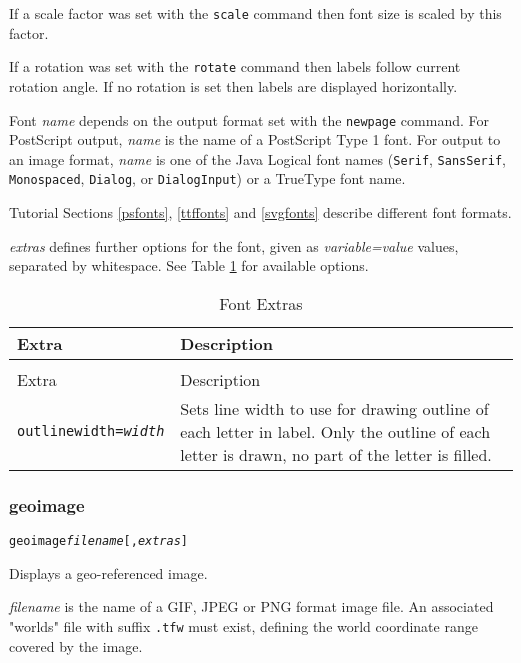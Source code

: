 If a scale factor was set with the
\texttt{scale} command
then font size is scaled by this factor.

If a rotation was set with the
\texttt{rotate} command
then labels follow current rotation angle.
If no rotation is set then labels are displayed
horizontally.

Font \textit{name}
depends on the output format set with the
\texttt{newpage} command.
For PostScript output, \textit{name} is the name of a PostScript Type 1
font.
For output to an image format, \textit{name} is one of the Java Logical
font names (\texttt{Serif}, \texttt{SansSerif},
\texttt{Monospaced}, \texttt{Dialog}, or \texttt{DialogInput}) or a TrueType
font name.

Tutorial Sections \ref{psfonts}, \ref{ttffonts} and \ref{svgfonts}
describe different font formats.

\textit{extras} defines further options for the font, given as
\textit{variable=value} values, separated by whitespace.
See Table \ref{fontextras}
for available options.

\begin{longtable}{|l|p{7cm}|}
\hline
\label{fontextras}
Extra & Description \\
\hline
\hline
\endfirsthead
\hline
\caption{Font Extras} \\
\endfoot

\hline
Extra & Description \\
\hline
\hline
\endhead

\texttt{outlinewidth=\textit{width}} &

Sets line width to use for drawing outline of each letter in label.
Only the outline of each letter is drawn, no part of the letter is filled. \\

\hline
\end{longtable}

\subsubsection{geoimage}

\begin{alltt}
geoimage \textit{filename} [, \textit{extras} ]
\end{alltt}

Displays a geo-referenced image.

\textit{filename} is the name of a GIF, JPEG or PNG format image file.
An associated "worlds" file with suffix \texttt{.tfw} must exist,
defining the world coordinate range covered by the image.

